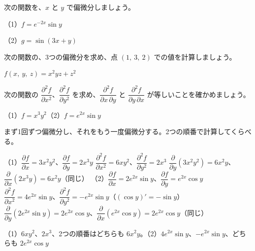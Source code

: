 \noindent\begin{minipage}[t]{0.49\linewidth}
\begin{jibun}
次の関数を、$x$ と $y$ で偏微分しましょう。\par
（1）$f=e^{-2x}\sin y$\par
（2）$g=\sin(3x+y)$
\end{jibun}
\end{minipage}\hfill
\begin{minipage}[t]{0.49\linewidth}
\begin{jibun}
次の関数の、3つの偏微分を求め、点 $(1,\ 3,\ 2)$ での値を計算しましょう。\par
$f(x,\ y,\ z)=x^2yz+z^2$
\end{jibun}
\end{minipage}\par

\begin{reidai}
次の関数の $\dfrac{\partial^2f}{\partial x^2}$、$\dfrac{\partial^2f}{\partial y^2}$ を求め、$\dfrac{\partial^2f}{\partial x\,\partial y}$ と $\dfrac{\partial^2f}{\partial y\,\partial x}$ が等しいことを確かめましょう。\par
（1）$f=x^3y^2$\qquad（2）$f=e^{2x}\sin y$\par
\kangaekata まず1回ずつ偏微分し、それをもう一度偏微分する。2つの順番で計算してくらべる。\par
\shiki（1）$\dfrac{\partial f}{\partial x}=3x^2y^2$、$\dfrac{\partial f}{\partial y}=2x^3y$\kviiicq
$\dfrac{\partial^2f}{\partial x^2}=6xy^2$、$\dfrac{\partial^2f}{\partial y^2}=2x^3$\kviiicq
$\dfrac{\partial}{\partial y}(3x^2y^2)=6x^2y$、$\dfrac{\partial}{\partial x}(2x^3y)=6x^2y$（同じ）\kviiicq
（2）$\dfrac{\partial f}{\partial x}=2e^{2x}\sin y$、$\dfrac{\partial f}{\partial y}=e^{2x}\cos y$\kviiicq
$\dfrac{\partial^2f}{\partial x^2}=4e^{2x}\sin y$、$\dfrac{\partial^2f}{\partial y^2}=-e^{2x}\sin y$（$(\cos y)'=-\sin y$）\kviiicq
$\dfrac{\partial}{\partial y}(2e^{2x}\sin y)=2e^{2x}\cos y$、$\dfrac{\partial}{\partial x}(e^{2x}\cos y)=2e^{2x}\cos y$（同じ）\par
\kotae（1）\nobreak $6xy^2$、$2x^3$、2つの順番はどちらも $6x^2y$。（2）\nobreak $4e^{2x}\sin y$、$-e^{2x}\sin y$、どちらも $2e^{2x}\cos y$
\end{reidai}

